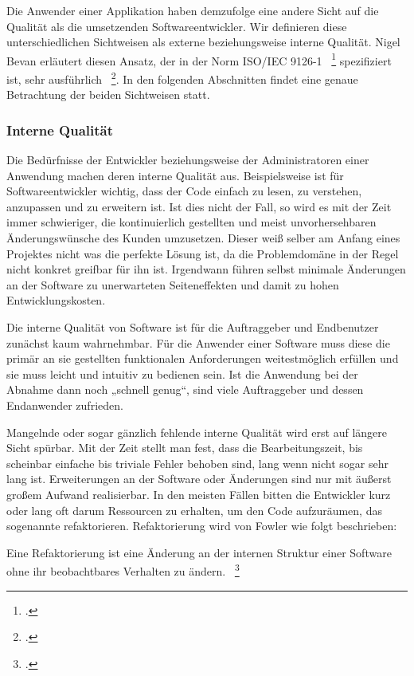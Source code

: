 Die Anwender einer Applikation haben demzufolge eine andere Sicht auf die Qualität als die umsetzenden Softwareentwickler. Wir definieren diese unterschiedlichen Sichtweisen als externe beziehungsweise interne Qualität. Nigel Bevan erläutert diesen Ansatz, der in der Norm ISO/IEC 9126-1 ~\footcite[]{ISOIEC91261} spezifiziert ist, sehr ausführlich ~\footcite[]{Bevan.1999}. In den folgenden Abschnitten findet eine genaue Betrachtung der beiden Sichtweisen statt.

\subsubsection{Interne Qualität}
Die Bedürfnisse der Entwickler beziehungsweise der Administratoren einer Anwendung machen deren interne Qualität aus. Beispielsweise ist für Softwareentwickler wichtig, dass der Code einfach zu lesen, zu verstehen, anzupassen und zu erweitern ist. Ist dies nicht der Fall, so wird es mit der Zeit immer schwieriger, die kontinuierlich gestellten und meist unvorhersehbaren Änderungswünsche des Kunden umzusetzen. Dieser weiß selber am Anfang eines Projektes nicht was die perfekte Lösung ist, da die Problemdomäne in der Regel nicht konkret greifbar für ihn ist. Irgendwann führen selbst minimale Änderungen an der Software zu unerwarteten Seiteneffekten und damit zu hohen Entwicklungskosten.

Die interne Qualität von Software ist für die Auftraggeber und Endbenutzer zunächst kaum wahrnehmbar. Für die Anwender einer Software muss diese die primär an sie gestellten funktionalen Anforderungen weitestmöglich erfüllen und sie muss leicht und intuitiv zu bedienen sein. Ist die Anwendung bei der Abnahme dann noch „schnell genug“, sind viele Auftraggeber und dessen Endanwender zufrieden.

Mangelnde oder sogar gänzlich fehlende interne Qualität wird erst auf längere Sicht spürbar. Mit der Zeit stellt man fest, dass die Bearbeitungszeit, bis scheinbar einfache bis triviale Fehler behoben sind, lang wenn nicht sogar sehr lang ist. Erweiterungen an der Software oder Änderungen sind nur mit äußerst großem Aufwand realisierbar. In den meisten Fällen bitten die Entwickler kurz oder lang oft darum Ressourcen zu erhalten, um den Code aufzuräumen, das sogenannte refaktorieren. Refaktorierung wird von Fowler wie folgt beschrieben: 

\dq{}Eine Refaktorierung ist eine Änderung an der internen Struktur einer Software ohne ihr beobachtbares Verhalten zu ändern.\dq{} ~\footcite[Seite xviii]{Fowler.2000}

